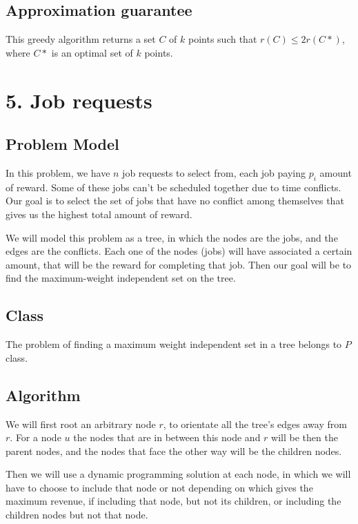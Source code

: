 \documentclass{article}
\begin{document}
\subsection*{Approximation guarantee}

This greedy algorithm returns a set $C$ of $k$ points such that $r(C)\leq 2r(C\ast)$, where $C\ast$ is an optimal set of $k$ points.

\section*{5. Job requests}

\subsection*{Problem Model}

In this problem, we have $n$ job requests to select from, each job paying $p_i$ amount of reward. Some of these jobs can't be scheduled together due to time conflicts. Our goal is to select the set of jobs that have no conflict among themselves that gives us the highest total amount of reward.

We will model this problem as a tree, in which the nodes are the jobs, and the edges are the conflicts. Each one of the nodes (jobs) will have associated a certain amount, that will be the reward for completing that job. Then our goal will be to find the maximum-weight independent set on the tree.

\subsection*{Class}

The problem of finding a maximum weight independent set in a tree belongs to $P$ class.

\subsection*{Algorithm}

We will first root an arbitrary node $r$, to orientate all the tree's edges away from $r$. For a node $u$ the nodes that are in between this node and $r$ will be then the parent nodes, and the nodes that face the other way will be the children nodes.

Then we will use a dynamic programming solution at each node, in which we will have to choose to include that node or not depending on which gives the maximum revenue, if including that node, but not its children, or including the children nodes but not that node.
\end{document}
